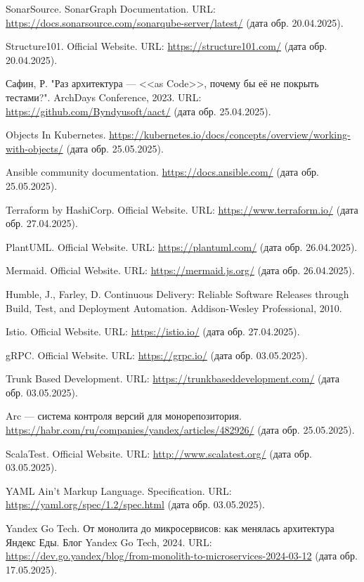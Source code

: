 \documentclass[a4paper,article,14pt]{extarticle}
\begin{document}
\begin{thebibliography}{1}
 SonarSource. SonarGraph Documentation. URL: \url{https://docs.sonarsource.com/sonarqube-server/latest/} (дата обр. 20.04.2025).

 Structure101. Official Website. URL: \url{https://structure101.com/} (дата обр. 20.04.2025).

 Сафин, Р. "Раз архитектура — <<as Code>>, почему бы её не покрыть тестами?". ArchDays Conference, 2023. URL: \url{https://github.com/Byndyusoft/aact/} (дата обр. 25.04.2025).

 Objects In Kubernetes. \url{https://kubernetes.io/docs/concepts/overview/working-with-objects/} (дата обр. 25.05.2025).

 Ansible community documentation. \url{https://docs.ansible.com/} (дата обр. 25.05.2025).

 Terraform by HashiCorp. Official Website. URL: \url{https://www.terraform.io/} (дата обр. 27.04.2025).

 PlantUML. Official Website. URL: \url{https://plantuml.com/} (дата обр. 26.04.2025).

 Mermaid. Official Website. URL: \url{https://mermaid.js.org/} (дата обр. 26.04.2025).

 Humble, J., Farley, D. Continuous Delivery: Reliable Software Releases through Build, Test, and Deployment Automation. Addison-Wesley Professional, 2010.

 Istio. Official Website. URL: \url{https://istio.io/} (дата обр. 27.04.2025).

 gRPC. Official Website. URL: \url{https://grpc.io/} (дата обр. 03.05.2025).

 Trunk Based Development. URL: \url{https://trunkbaseddevelopment.com/} (дата обр. 03.05.2025).

 Arc — система контроля версий для монорепозитория. \url{https://habr.com/ru/companies/yandex/articles/482926/} (дата обр. 25.05.2025).

 ScalaTest. Official Website. URL: \url{http://www.scalatest.org/} (дата обр. 03.05.2025).

 YAML Ain't Markup Language. Specification. URL: \url{https://yaml.org/spec/1.2/spec.html} (дата обр. 03.05.2025).

 Yandex Go Tech. От монолита до микросервисов: как менялась архитектура Яндекс Еды. Блог Yandex Go Tech, 2024. URL: \url{https://dev.go.yandex/blog/from-monolith-to-microservices-2024-03-12} (дата обр. 17.05.2025).


\end{thebibliography}
\end{document}
